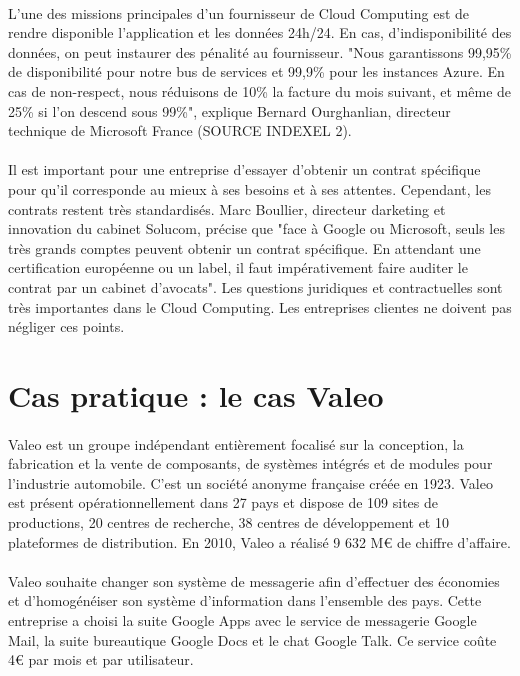 \documentclass[a4paper,12pt]{report}
\begin{document}
\begin{onehalfspace}
	\paragraph*{}
	L’une des missions principales d’un fournisseur de Cloud Computing est de rendre disponible l’application et les données 24h/24. En cas, d’indisponibilité des données, on peut instaurer des pénalité au fournisseur. "Nous garantissons 99,95\% de disponibilité pour notre bus de services et 99,9\% pour les instances Azure. En cas de non-respect, nous réduisons de 10\% la facture du mois suivant, et même de 25\% si l'on descend sous 99\%", explique Bernard Ourghanlian, directeur technique de Microsoft France (SOURCE INDEXEL 2).
	\paragraph*{}
	Il est important pour une entreprise d’essayer d’obtenir un contrat spécifique pour qu’il corresponde au mieux à ses besoins et à ses attentes. Cependant, les contrats restent très standardisés. Marc Boullier, directeur darketing et innovation du cabinet Solucom, précise que "face à Google ou Microsoft, seuls les très grands comptes peuvent obtenir un contrat spécifique. En attendant une certification européenne ou un label, il faut impérativement faire auditer le contrat par un cabinet d'avocats".
Les questions juridiques et contractuelles sont très importantes dans le Cloud Computing. Les entreprises clientes ne doivent pas négliger ces points.


	\section{Cas pratique : le cas Valeo}

	\paragraph*{}
	Valeo est un groupe indépendant entièrement focalisé sur la conception, la fabrication et la vente de composants, de systèmes intégrés et de modules pour l’industrie automobile. C’est un société anonyme française créée en 1923. Valeo est présent opérationnellement dans 27 pays et dispose de 109 sites de productions, 20 centres de recherche, 38 centres de développement et 10 plateformes de distribution. En 2010, Valeo a réalisé 9 632 M\euro{} de chiffre d’affaire.
	\paragraph*{}
	Valeo souhaite changer son système de messagerie afin d’effectuer des économies et d'homogénéiser son système d’information dans l’ensemble des pays. Cette entreprise a choisi la suite Google Apps avec le service de messagerie Google Mail, la suite bureautique Google Docs et le chat Google Talk. Ce service coûte 4\euro{} par mois et par utilisateur.

\end{onehalfspace}
\end{document}
